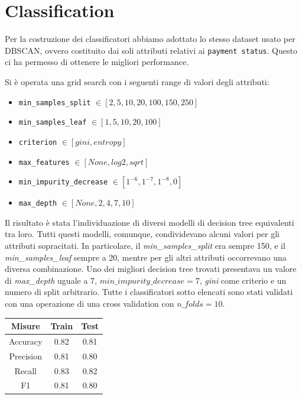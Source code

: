 \chapter{Classification}

Per la costruzione dei classificatori abbiamo adottato lo stesso dataset
usato per DBSCAN, ovvero costituito dai soli attributi relativi ai
\texttt{payment status}. Questo ci ha permesso di ottenere le migliori
performance.

Si \`e operata una grid search con i seguenti range di valori degli attributi:
\begin{itemize}
	\item \texttt{min\_samples\_split} $\in [2, 5, 10, 20, 100, 150, 250]$
	\item \texttt{min\_samples\_leaf} $\in [1, 5, 10, 20, 100]$
	\item \texttt{criterion} $\in [gini, entropy]$
	\item \texttt{max\_features} $\in [None, log2, sqrt]$
	\item \texttt{min\_impurity\_decrease} $\in [1^{-6}, 1^{-7}, 1^{-8}, 0]$
	\item \texttt{max\_depth} $\in [None, 2, 4, 7, 10]$
\end{itemize}

Il risultato \`e stata l'individuazione di diversi modelli di decision tree
equivalenti tra loro. Tutti questi modelli, comunque, condividevano alcuni
valori per gli attributi sopracitati. In particolare, il \textit{min\_samples\_split}
era sempre 150, e il \textit{min\_samples\_leaf} sempre a 20, mentre per gli altri
attributi occorrevano una diversa combinazione. Uno dei migliori decision tree
trovati presentava un valore di \textit{max\_depth} uguale a 7,
$min\_impurity\_decrease=7$, \textit{gini} come criterio e un numero di split
arbitrario.
Tutte i classificatori sotto elencati sono stati validati con una operazione
di una cross validation con $n\_folds=10$. 

\begin{center}
	\begin{tabular}{c|c|c}
		\hline
		\textbf{Misure} & \textbf{Train} & \textbf{Test}\\
		\hline
		Accuracy & 0.82 & 0.81\\
		\hline
		Precision & 0.81 & 0.80\\
		\hline
		Recall & 0.83 & 0.82\\
		\hline
		F1 & 0.81 & 0.80\\
		\hline
	\end{tabular}
\end{center}

